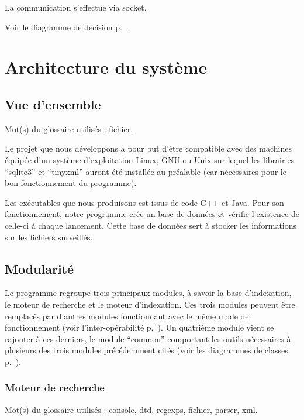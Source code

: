 \documentclass[a4paper,12pt]{report}
\begin{document}
La communication s'effectue via socket.

Voir le diagramme de décision p.~\pageref{decision-mi}.

\chapter{Architecture du système}

\section{Vue d'ensemble}
Mot(s) du glossaire utilisés : \gls{fichier}.

Le projet que nous développons a pour but d'être compatible avec des machines équipée d'un système d'exploitation Linux, GNU ou Unix sur lequel les librairies \enquote{sqlite3} et \enquote{tinyxml} auront été installée au préalable (car nécessaires pour le bon fonctionnement du programme).

Les exécutables que nous produisons est issus de code C++ et Java.
Pour son fonctionnement, notre programme crée un base de données et vérifie l'existence de celle-ci à chaque lancement. Cette base de données sert à stocker les informations sur les fichiers surveillés.

\section{Modularité}
Le programme regroupe trois principaux modules, à savoir la base d'indexation, le moteur de recherche  et le moteur d'indexation. Ces trois modules peuvent être remplacés par d'autres modules fonctionnant avec le même mode de fonctionnement (voir l'inter-opérabilité p.~\pageref{inter_operabilite}). Un quatrième module vient se rajouter à ces derniers, le module \enquote{common} comportant les outils nécessaires à plusieurs des trois modules précédemment cités (voir les diagrammes de classes p.~\pageref{common}).

\subsection{Moteur de recherche}
Mot(s) du glossaire utilisés : \gls{console}, \gls{dtd}, \glspl{regexp}, \gls{fichier}, \gls{parser}, \gls{xml}.
\end{document}
